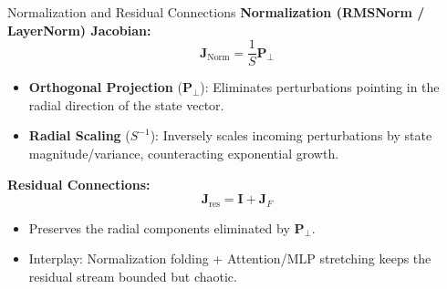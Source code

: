\documentclass[10pt,aspectratio=169]{beamer}
\begin{document}

\begin{frame}{Normalization and Residual Connections}
  \textbf{Normalization (RMSNorm / LayerNorm) Jacobian:}
  \begin{equation*}
    \mathbf{J}_{\text{Norm}} = \frac{1}{S} \mathbf{P}_{\perp}
  \end{equation*}
  \begin{itemize}
    \item \textbf{Orthogonal Projection} ($\mathbf{P}_{\perp}$): Eliminates perturbations pointing in the radial direction of the state vector.
    \item \textbf{Radial Scaling} ($S^{-1}$): Inversely scales incoming perturbations by state magnitude/variance, counteracting exponential growth.
  \end{itemize}

  \textbf{Residual Connections:}
  \begin{equation*}
    \mathbf{J}_{\text{res}} = \mathbf{I} + \mathbf{J}_F
  \end{equation*}
  \begin{itemize}
    \item Preserves the radial components eliminated by $\mathbf{P}_{\perp}$.
    \item Interplay: Normalization folding + Attention/MLP stretching keeps the residual stream bounded but chaotic.
  \end{itemize}
\end{frame}
\end{document}
